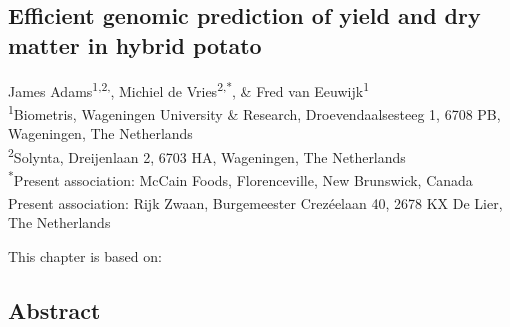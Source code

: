 \begin{refsection}
\chapter[Efficient genomic prediction of yield and dry matter in hybrid potato]{Efficient genomic prediction of yield and dry matter in hybrid potato}

\label{cha:chapter3}
\begin{center}
James Adams\textsuperscript{1,2,\textdagger},
Michiel de Vries\textsuperscript{2,*}, \&
Fred van Eeuwijk\textsuperscript{1}\\[0.5em]
\small
\textsuperscript{1}Biometris, Wageningen University \& Research, Droevendaalsesteeg 1, 6708 PB, Wageningen, The Netherlands\\
\textsuperscript{2}Solynta, Dreijenlaan 2, 6703 HA, Wageningen, The Netherlands\\
\textsuperscript{*}Present association: McCain Foods, Florenceville, New Brunswick, Canada\\
\textsuperscript{\textdagger } Present association: Rijk Zwaan, Burgemeester Crezéelaan 40, 2678 KX De Lier, The Netherlands\\
\end{center}
\vspace{0.5em}

\vspace*{\fill}
This chapter is based on:
\\
\begin{quote}
\end{quote}
\newpage

\section*{Abstract}


\end{refsection}
